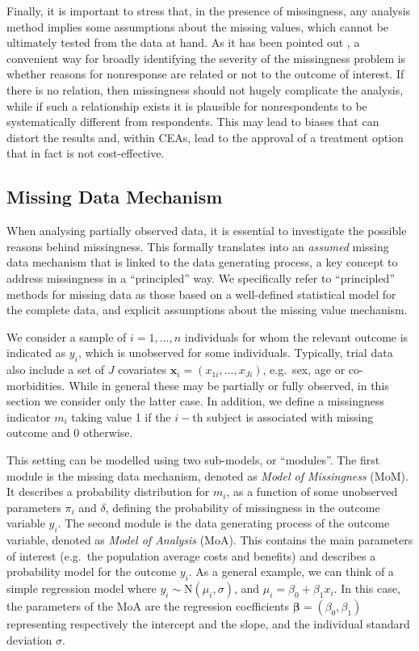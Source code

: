 \documentclass[]{article}
\begin{document}
Finally, it is important to stress that, in the presence of missingness,
any analysis method implies some assumptions about the missing values,
which cannot be ultimately tested from the data at hand. As it has been
pointed out \citep{Molenberghsb}, a convenient way for broadly
identifying the severity of the missingness problem is whether reasons
for nonresponse are related or not to the outcome of interest. If there
is no relation, then missingness should not hugely complicate the
analysis, while if such a relationship exists it is plausible for
nonrespondents to be systematically different from respondents. This may
lead to biases that can distort the results and, within CEAs, lead to
the approval of a treatment option that in fact is not cost-effective.

\subsection{\texorpdfstring{Missing Data
Mechanism\label{MDM}}{Missing Data Mechanism}}\label{missing-data-mechanism}

When analysing partially observed data, it is essential to investigate
the possible reasons behind missingness. This formally translates
into an \textit{assumed} missing data mechanism \citep{Rubina} that is
linked to the data generating process, a key concept to address
missingness in a ``principled'' way. We specifically refer to
``principled'' methods for missing data as those based on a well-defined
statistical model for the complete data, and explicit assumptions about
the missing value mechanism.

We consider a sample of \(i=1,\ldots,n\) individuals for whom the
relevant outcome is indicated as \(y_i\), which is unobserved for some
individuals. Typically, trial data also include a set of \(J\)
covariates \(\bm{x}_i=(x_{1i},\ldots,x_{Ji})\), e.g.~sex, age or
co-morbidities. While in general these may be partially or fully
observed, in this section we consider only the latter case. In addition,
we define a missingness indicator \(m_{i}\) taking value 1 if the
\(i-\)th subject is associated with missing outcome and 0 otherwise.

This setting can be modelled using two sub-models, or ``modules''. The
first module is the missing data mechanism, denoted as
\textit{Model of Missingness} (MoM). It describes a probability
distribution for \(m_{i}\), as a function of some unobserved parameters
\(\pi_{i}\) and \(\delta\), defining the probability of missingness in
the outcome variable \(y_{i}\). The second module is the data generating
process of the outcome variable, denoted as \textit{Model of Analysis}
(MoA). This contains the main parameters of interest (e.g.~the
population average costs and benefits) and describes a probability model
for the outcome \(y_{i}\). As a general example, we can think of a
simple regression model where \(y_i\sim\mbox{N}(\mu_i,\sigma)\), and
\(\mu_{i} = \beta_0+\beta_1 x_i\). In this case, the parameters of the
MoA are the regression coefficients \(\bm\beta=(\beta_0,\beta_1)\)
representing respectively the intercept and the slope, and the
individual standard deviation \(\sigma\).
\end{document}
